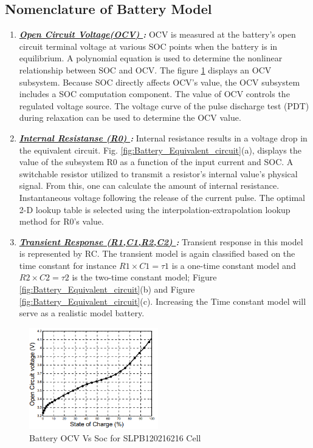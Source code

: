 \subsection{Nomenclature of Battery Model}
\begin{enumerate}
	\item \textbf{\textit{\underline{Open Circuit Voltage(OCV) }:}} OCV is measured at the battery's open circuit terminal voltage at various SOC points when the battery is in equilibrium. A polynomial equation is used to determine the nonlinear relationship between SOC and OCV. The figure \ref{fig:Battery_OCV_Vs_Soc} displays an OCV subsystem. Because SOC directly affects OCV's value, the OCV subsystem includes a SOC computation component. The value of OCV controls the regulated voltage source. The voltage curve of the pulse discharge test (PDT) during relaxation can be used to determine the OCV value\cite{Batt_Modeling_Kharisma}.
	\item \textbf{\textit{\underline{Internal Resistanse (R0) }:}} Internal resistance results in a voltage drop in the equivalent circuit. Fig. \ref{fig:Battery_Equivalent_circuit}(a), displays the value of the subsystem R0
	as a function of the input current and SOC. A switchable resistor
	utilized to transmit a resistor's internal value's physical signal.
	From this, one can calculate the amount of internal resistance.
	Instantaneous voltage following the release of the current pulse. 
	The optimal 2-D lookup table is selected using
	the interpolation-extrapolation lookup method for R0's value\cite{Batt_Modeling_Kharisma}.
	\item \textbf{\textit{\underline{Transient Response (R1,C1,R2,C2) }:}} Transient response in this model is represented by RC.
	The transient model is again classified based on the time constant for instance $R1\times C1 = \tau 1$ is a one-time constant model and $R2\times C2 = \tau 2$  is the two-time constant model; Figure \ref{fig:Battery_Equivalent_circuit}(b) and Figure \ref{fig:Battery_Equivalent_circuit}(c). Increasing the Time constant model will serve as a realistic model battery\cite{Batt_Modeling_Kharisma}.
\end{enumerate}

\begin{figure}[h]
	\centering
	\includegraphics[width=0.5\textwidth]{Chap06/Figures/Batt_OCV_SOC.PNG}
	\caption{Battery OCV Vs Soc for SLPB120216216 Cell \cite{UKEMPT_AHMAD2012}}
	\label{fig:Battery_OCV_Vs_Soc}
\end{figure}

